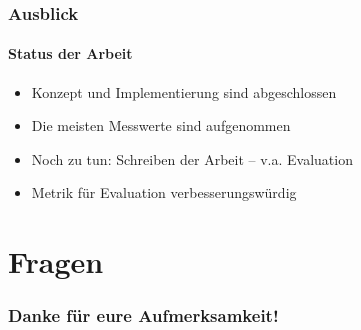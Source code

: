 \documentclass{beamer}
\begin{document}
\begin{frame}
	\frametitle{Ausblick}
	\framesubtitle{Status der Arbeit}
	\begin{itemize}
		\item Konzept und Implementierung sind abgeschlossen
		\item Die meisten Messwerte sind aufgenommen
		\item	Noch zu tun: Schreiben der Arbeit – v.a. Evaluation
		\item Metrik für Evaluation verbesserungswürdig
	\end{itemize}	
\end{frame}
\section*{Fragen}
\begin{frame}
	\frametitle{Danke für eure Aufmerksamkeit!}
\end{frame}
\end{document}
